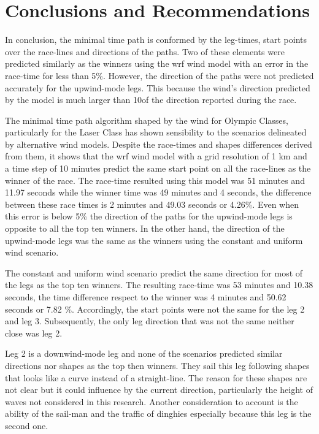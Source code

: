 \chapter{Conclusions and Recommendations}
In conclusion, the minimal time path is conformed by the leg-times, start points over the race-lines and directions of the paths. Two of these elements were predicted similarly as the winners using the \acrshort{wrf} wind model with an error in the race-time for less than 5\%. However, the direction of the paths were not predicted accurately for the upwind-mode legs. This because the wind's direction predicted by the model is much larger than 10\degree of the direction reported during the race. \par

The minimal time path algorithm shaped by the wind for Olympic Classes, particularly for the Laser Class has shown sensibility to the scenarios delineated by alternative wind models. Despite the race-times and shapes differences derived from them, it shows that the \acrshort{wrf} wind model with a grid resolution of 1 km and a time step of 10 minutes predict the same start point on all the race-lines as the winner of the race. The race-time resulted using this model was 51 minutes and 11.97 seconds while the winner time was 49 minutes and 4 seconds, the difference between these race times is 2 minutes and 49.03 seconds or 4.26\%. Even when this error is below 5\% the direction of the paths for the upwind-mode legs is opposite to all the top ten winners. In the other hand, the direction of the upwind-mode legs was the same as the winners using the constant and uniform wind scenario. \par

The constant and uniform wind scenario predict the same direction for most of the legs as the top ten winners. The resulting race-time was 53 minutes and 10.38 seconds, the time difference respect to the winner was 4 minutes and 50.62 seconds or 7.82 \%. Accordingly, the start points were not the same for the leg 2 and leg 3. Subsequently, the only leg direction that was not the same neither close was leg 2. \par 
Leg 2 is a downwind-mode leg and none of the scenarios predicted similar directions nor shapes as the top then winners. They sail this leg following shapes that looks like a curve instead of a straight-line. The reason for these shapes are not clear but it could influence by the current direction, particularly the height of waves not considered in this research. Another consideration to account is the ability of the sail-man and the traffic of dinghies especially because this leg is the second one. \par  %

